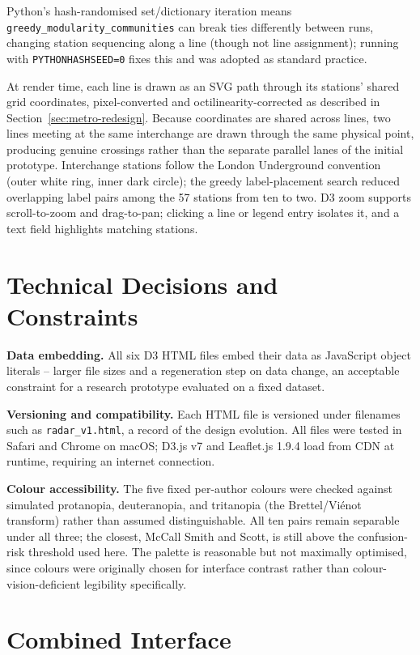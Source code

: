 \documentclass[logo,msc]{infthesis}
\begin{document}
Python's hash-randomised set/dictionary iteration means \texttt{greedy\_modularity\_communities} can break ties differently between runs, changing station sequencing along a line (though not line assignment); running with \texttt{PYTHONHASHSEED=0} fixes this and was adopted as standard practice.

At render time, each line is drawn as an SVG path through its stations' shared grid coordinates, pixel-converted and octilinearity-corrected as described in Section~\ref{sec:metro-redesign}. Because coordinates are shared across lines, two lines meeting at the same interchange are drawn through the same physical point, producing genuine crossings rather than the separate parallel lanes of the initial prototype. Interchange stations follow the London Underground convention (outer white ring, inner dark circle); the greedy label-placement search reduced overlapping label pairs among the 57 stations from ten to two. D3 zoom supports scroll-to-zoom and drag-to-pan; clicking a line or legend entry isolates it, and a text field highlights matching stations.
 
\section{Technical Decisions and Constraints}
\label{sec:technical-decisions}

\textbf{Data embedding.} All six D3 HTML files embed their data as JavaScript object literals -- larger file sizes and a regeneration step on data change, an acceptable constraint for a research prototype evaluated on a fixed dataset.
 
\textbf{Versioning and compatibility.} Each HTML file is versioned under filenames such as \texttt{radar\_v1.html}, a record of the design evolution. All files were tested in Safari and Chrome on macOS; D3.js v7 and Leaflet.js 1.9.4 load from CDN at runtime, requiring an internet connection.

\textbf{Colour accessibility.} The five fixed per-author colours were checked against simulated protanopia, deuteranopia, and tritanopia (the Brettel/Vi{\'e}not transform) rather than assumed distinguishable. All ten pairs remain separable under all three; the closest, McCall Smith and Scott, is still above the confusion-risk threshold used here. The palette is reasonable but not maximally optimised, since colours were originally chosen for interface contrast rather than colour-vision-deficient legibility specifically.
 
\section{Combined Interface}
\label{sec:combined-interface}
\end{document}
